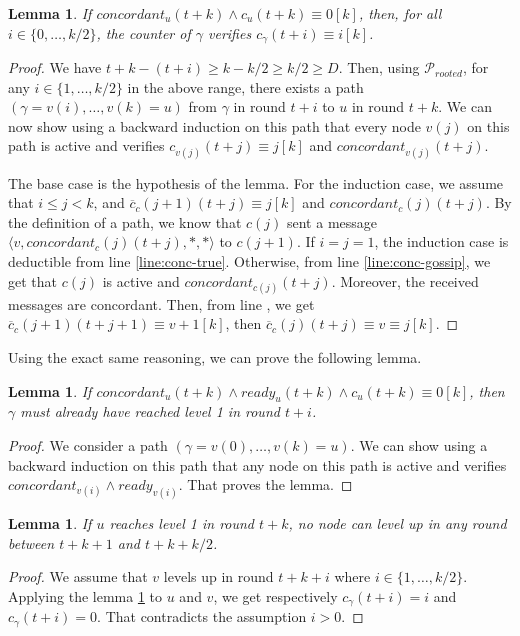 \documentclass[11pt,letterpaper]{article}
\renewcommand{\leq}{\leqslant}
\renewcommand{\geq}{\geqslant}
\newtheorem{lem}[thm]{Lemma}
\newcommand{\cent}{\gamma}
\begin{document}
\begin{lem} \label{lem:conc-safety}
	If $concordant_u(t+k) \wedge c_u(t+k) \equiv 0 [k]$, then, for all $i \in \{0, \dots, k/2\}$, the counter of $\cent$ verifies $c_\cent(t+i) \equiv i [k]$.
\end{lem}
\begin{proof}
	We have $t+k - (t+i) \geq k - k/2 \geq k/2 \geq D$.
	Then, using $\mathcal{P}_{rooted}$, for any $i \in \{1, \dots, k/2\}$ in the above range, there exists a path $(\cent = v(i), \dots, v(k) = u)$ from $\cent$ in round $t+i$ to $u$ in round $t+k$. 
	We can now show using a backward induction on this path that every node $v(j)$ on this path is active and verifies $c_{v(j)}(t+j) \equiv j [k]$ and $concordant_{v(j)}(t+j)$.

	The base case is the hypothesis of the lemma.
	For the induction case, we assume that $i \leq j < k$, and $\overline{c}_c(j+1)(t+j) \equiv j [k]$ and $concordant_c(j)(t+j)$.
	By the definition of a path, we know that $c(j)$ sent a message $\langle v, concordant_c(j)(t+j), *, * \rangle$ to $c(j+1)$.
	If $i = j = 1$, the induction case is deductible from line \ref{line:conc-true}.
	Otherwise, from line \ref{line:conc-gossip}, we get that $c(j)$ is active and $concordant_{c(j)}(t+j)$. Moreover, the received messages are concordant.
	Then, from line \label{line:min-z-end}, we get $\overline{c}_c(j+1)(t+j+1) \equiv v+1 [k]$, then $\overline{c}_c(j)(t+j) \equiv v \equiv j [k]$.
\end{proof}

\noindent Using the exact same reasoning, we can prove the following lemma.
\begin{lem} \label{lem:conc-safety-bis}
	If $concordant_u(t+k) \wedge ready_u(t+k) \wedge c_u(t+k) \equiv 0 [k]$, then $\cent$ must already have reached level 1 in round $t+i$.
\end{lem}
\begin{proof}
	We consider a path $(\cent = v(0), \dots, v(k) = u)$.
	We can show using a backward induction on this path that any node on this path is active and verifies $concordant_{v(i)} \wedge ready_{v(i)}$.
	That proves the lemma.
\end{proof}

\begin{lem} \label{lem:no-close-level2}
	If $u$ reaches level 1 in round $t+k$, no node can level up in any round between $t+k+1$ and $t+k+k/2$.
\end{lem}
\begin{proof}
	We assume that $v$ levels up in round $t+k+i$ where $i \in \{1, \dots, k/2\}$.
	Applying the lemma \ref{lem:conc-safety} to $u$ and $v$, we get respectively $c_\cent(t+i) = i$ and $c_\cent(t+i) = 0$.
	That contradicts the assumption $i > 0$.
\end{proof}
\end{document}
